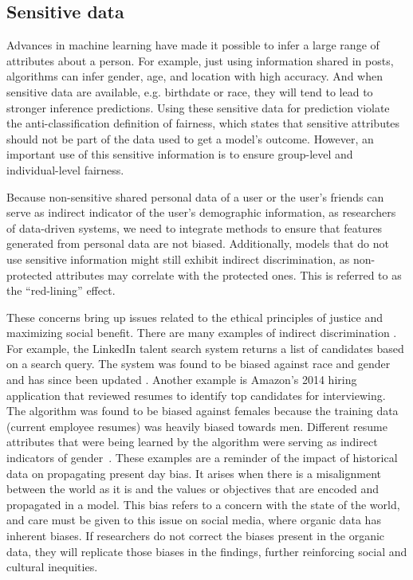 \documentclass[11pt]{article} %
\begin{document}
\subsection{Sensitive data}
Advances in machine learning have made it possible to infer a large range of attributes about a person. For example, just using information shared in posts, algorithms can infer gender, age, and location with high accuracy.  And when sensitive data are available, e.g. birthdate or race, they will tend to lead to stronger inference predictions. Using these sensitive data for prediction violate the anti-classification definition of fairness, which states that sensitive attributes should not be part of the data used to get a model's outcome. However, an important use of this sensitive information is to ensure group-level and individual-level fairness. 

Because non-sensitive shared personal data of a user or the user's friends can serve as indirect indicator of the user's demographic information, as researchers of data-driven systems, we need to integrate methods to ensure that features generated from personal data are not biased. Additionally, models that do not use sensitive information might still exhibit indirect discrimination, as non-protected attributes may correlate with the protected ones. This is referred to as the ``red-lining'' effect. 

These concerns bring up issues related to the ethical principles of justice and maximizing social benefit. There are many examples of indirect discrimination \cite{oneil2016}. For example, the LinkedIn talent search system returns a list of candidates based on a search query. The system was found to be biased against race and gender and has since been updated \cite{linkedin_unfair}. Another example is Amazon's 2014 hiring application that reviewed resumes to identify top candidates for interviewing. The algorithm was found to be biased against females because the training data (current employee resumes) was heavily biased towards men. Different resume attributes that were being learned by the algorithm were serving as indirect indicators of gender~\cite{dastin_2018}.
These examples are a reminder of the impact of historical data on propagating present day bias. It arises when there is a misalignment between the world as it is and the values or objectives that are encoded and propagated in a model. This bias refers to a concern with the state of the world, and care must be given to this issue on social media, where organic data has inherent biases. If researchers do not correct the biases present in the organic data, they will replicate those biases in the findings, further reinforcing social and cultural inequities. 
\end{document}

